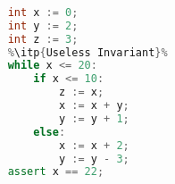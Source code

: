 \begin{lstlisting}[language=C++,basicstyle=\ttfamily,keywordstyle=\color{blue}, escapechar=\%]  % Start your code-block
	
	int x := 0;
	int y := 2;
	int z := 3;
	%\itp{Useless Invariant}%
	while x <= 20:
		if x <= 10:
			z := x;
			x := x + y;
			y := y + 1;
		else:
			x := x + 2;
			y := y - 3;
	assert x == 22;
	\end{lstlisting}